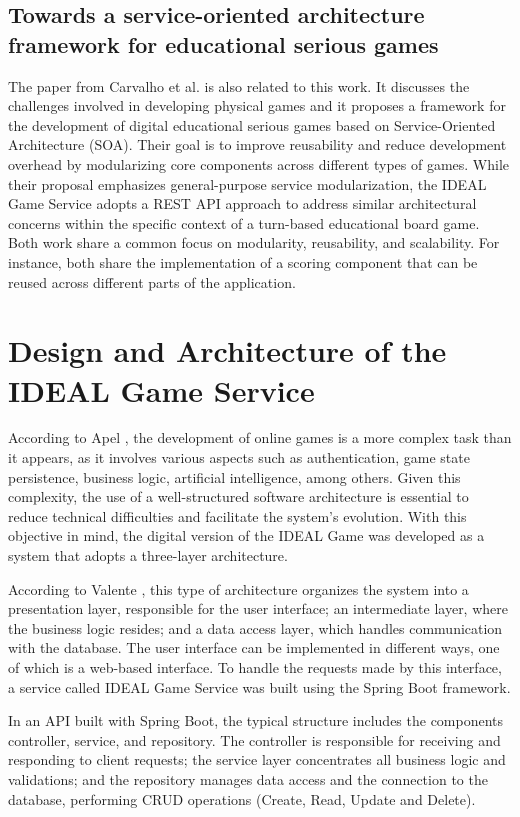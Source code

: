 \documentclass[english]{sbc2025}
\begin{document}
\subsection{Towards a service-oriented architecture framework for educational serious games}
The paper from Carvalho et al. \citep{carvalho2015towards} is also related to this work. It discusses the challenges involved in developing physical games and it proposes a framework for the development of digital educational serious games based on Service-Oriented Architecture (SOA). Their goal is to improve reusability and reduce development overhead by modularizing core components across different types of games. While their proposal emphasizes general-purpose service modularization, the IDEAL Game Service adopts a REST API approach to address similar architectural concerns within the specific context of a turn-based educational board game. Both work share a common focus on modularity, reusability, and scalability. For instance, both share the implementation of a scoring component that can be reused across different parts of the application.


\section{Design and Architecture of the IDEAL Game Service}

According to Apel \citep{apel2018reducing}, the development of online games is a more complex task than it appears, as it involves various aspects such as authentication, game state persistence, business logic, artificial intelligence, among others. Given this complexity, the use of a well-structured software architecture is essential to reduce technical difficulties and facilitate the system's evolution. With this objective in mind, the digital version of the IDEAL Game was developed as a system that adopts a three-layer architecture.

According to Valente \citep{valente2020engenharia}, this type of architecture organizes the system into a presentation layer, responsible for the user interface; an intermediate layer, where the business logic resides; and a data access layer, which handles communication with the database. The user interface can be implemented in different ways, one of which is a web-based interface. To handle the requests made by this interface, a service called IDEAL Game Service was built using the Spring Boot framework.

In an API built with Spring Boot, the typical structure includes the components controller, service, and repository. The controller is responsible for receiving and responding to client requests; the service layer concentrates all business logic and validations; and the repository manages data access and the connection to the database, performing CRUD operations (Create, Read, Update and Delete).
\end{document}
